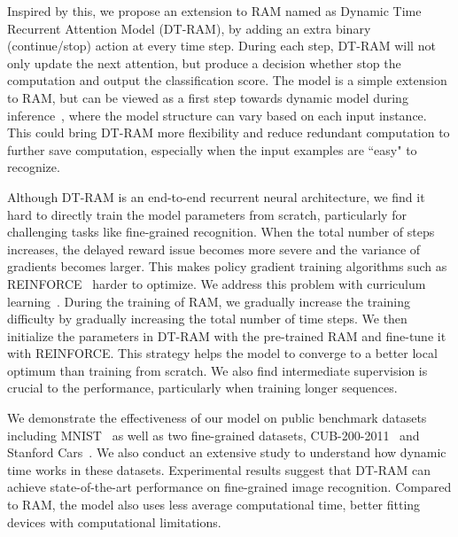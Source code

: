 \documentclass[10pt,twocolumn,letterpaper]{article}
\begin{document}
Inspired by this, we propose an extension to RAM named as Dynamic Time Recurrent Attention Model (DT-RAM), by adding an extra binary (continue/stop) action at every time step.
During each step, DT-RAM will not only update the next attention, but produce a decision whether stop the computation and output the classification score.
The model is a simple extension to RAM, but can be viewed as a first step towards dynamic model during inference~\cite{graves2016adaptive}, where the model structure can vary based on each input instance.
This could bring DT-RAM more flexibility and reduce redundant computation to further save computation, especially when the input examples are ``easy" to recognize.


Although DT-RAM is an end-to-end recurrent neural architecture, we find it hard to directly train the model parameters from scratch, particularly for challenging tasks like fine-grained recognition.
When the total number of steps increases, the delayed reward issue becomes more severe and the variance of gradients becomes larger.
This makes policy gradient training algorithms such as REINFORCE~\cite{sutton1999policy} harder to optimize.
We address this problem with curriculum learning~\cite{bengio2009curriculum}.
During the training of RAM, we gradually increase the training difficulty by gradually increasing the total number of time steps.
We then initialize the parameters in DT-RAM with the pre-trained RAM and fine-tune it with REINFORCE.
This strategy helps the model to converge to a better local optimum than training from scratch.
We also find intermediate supervision is crucial to the performance, particularly when training longer sequences.

We demonstrate the effectiveness of our model on public benchmark datasets including MNIST~\cite{lecun1998gradient} as well as two fine-grained datasets, CUB-200-2011~\cite{wah2011caltech} and Stanford Cars~\cite{krause20133d}.
We also conduct an extensive study to understand how dynamic time works in these datasets.
Experimental results suggest that DT-RAM can achieve state-of-the-art performance on fine-grained image recognition.
Compared to RAM, the model also uses less average computational time, better fitting devices with computational limitations.
\end{document}
